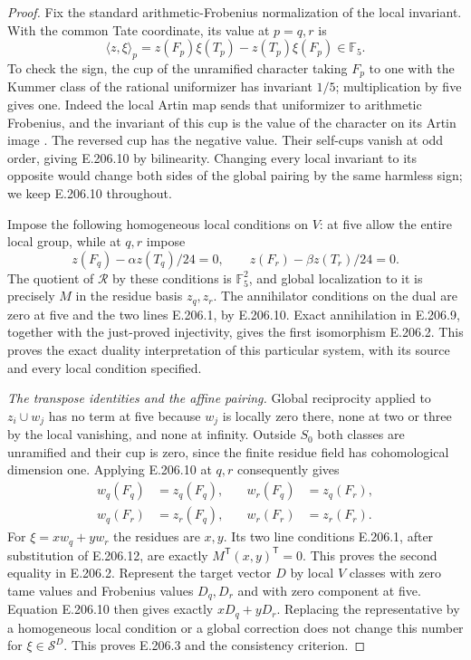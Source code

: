 \begin{proof}
Fix the standard arithmetic-Frobenius normalization of the
local invariant.  With the common Tate coordinate, its value
at $p=q,r$ is
\[
 \langle z,\xi\rangle_p
       =z(F_p)\xi(T_p)-z(T_p)\xi(F_p)\in\mathbb F_5.
 \tag{E.206.10}
\]
To check the sign, the cup of the unramified character taking
$F_p$ to one with the Kummer class of the rational uniformizer
has invariant $1/5$; multiplication by five gives one.
Indeed the local Artin map sends that uniformizer to arithmetic
Frobenius, and the invariant of this cup is the value of the
character on its Artin image
\citep[III, Proposition3.6 and Lemma3.7, pp.~109--110;
\S4, Steps2--3 and Proposition4.3, pp.~112--113]{RootMilneCFT}.
The reversed cup has the negative value.  Their self-cups
vanish at odd order, giving E.206.10 by bilinearity.
Changing every local invariant to its opposite would change
both sides of the global pairing by the same harmless sign;
we keep E.206.10 throughout.

Impose the following homogeneous local conditions on $V$:
at five allow the entire local group, while at $q,r$ impose
\[
 z(F_q)-\alpha z(T_q)/24=0,\qquad
 z(F_r)-\beta z(T_r)/24=0.
 \tag{E.206.11}
\]
The quotient of $\mathcal R$ by these conditions is
$\mathbb F_5^2$, and global localization to it is precisely
$M$ in the residue basis $z_q,z_r$.
The annihilator conditions on the dual are zero at five and
the two lines E.206.1, by E.206.10.  Exact annihilation in
E.206.9, together with the just-proved injectivity, gives the
first isomorphism E.206.2.  This proves the exact duality
interpretation of this particular system, with its source
and every local condition specified.

\emph{The transpose identities and the affine pairing.}
Global reciprocity applied to $z_i\cup w_j$ has no term at
five because $w_j$ is locally zero there, none at two or
three by the local vanishing, and none at infinity.  Outside
$S_0$ both classes are unramified and their cup is zero,
since the finite residue field has cohomological dimension
one.  Applying E.206.10 at $q,r$ consequently gives
\[
 \begin{aligned}
 w_q(F_q)&=z_q(F_q),&\quad w_r(F_q)&=z_q(F_r),\\
 w_q(F_r)&=z_r(F_q),&\quad w_r(F_r)&=z_r(F_r).
 \end{aligned}
 \tag{E.206.12}
\]
For $\xi=xw_q+yw_r$ the residues are $x,y$.
Its two line conditions E.206.1, after substitution of
E.206.12, are exactly $M^{\mathsf T}(x,y)^{\mathsf T}=0$.
This proves the second equality in E.206.2.
Represent the target vector $D$ by local $V$ classes with
zero tame values and Frobenius values $D_q,D_r$ and with
zero component at five.  Equation E.206.10 then gives
exactly $xD_q+yD_r$.  Replacing the representative by a
homogeneous local condition or a global correction does
not change this number for $\xi\in\mathcal S^D$.
This proves E.206.3 and the consistency criterion.


\end{proof}

